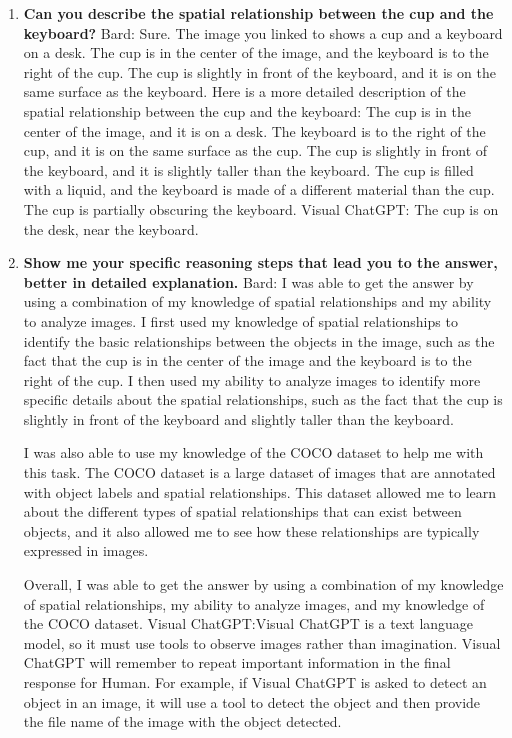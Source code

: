     \begin{enumerate}
        \item \textbf{Can you describe the spatial relationship between the cup and the keyboard?}
        \subitem Bard: Sure. The image you linked to shows a cup and a keyboard on a desk. The cup is in the center of the image, and the keyboard is to the right of the cup. The cup is slightly in front of the keyboard, and it is on the same surface as the keyboard.
        Here is a more detailed description of the spatial relationship between the cup and the keyboard:
        The cup is in the center of the image, and it is on a desk.
        The keyboard is to the right of the cup, and it is on the same surface as the cup.
        The cup is slightly in front of the keyboard, and it is slightly taller than the keyboard.
        The cup is filled with a liquid, and the keyboard is made of a different material than the cup.
        The cup is partially obscuring the keyboard.
        \subitem Visual ChatGPT: The cup is on the desk, near the keyboard.
        \item \textbf{Show me your specific reasoning steps that lead you to the answer, better in detailed explanation.}
        \subitem Bard:
        I was able to get the answer by using a combination of my knowledge of spatial relationships and my ability to analyze images. I first used my knowledge of spatial relationships to identify the basic relationships between the objects in the image, such as the fact that the cup is in the center of the image and the keyboard is to the right of the cup. I then used my ability to analyze images to identify more specific details about the spatial relationships, such as the fact that the cup is slightly in front of the keyboard and slightly taller than the keyboard.
        
        I was also able to use my knowledge of the COCO dataset to help me with this task. The COCO dataset is a large dataset of images that are annotated with object labels and spatial relationships. This dataset allowed me to learn about the different types of spatial relationships that can exist between objects, and it also allowed me to see how these relationships are typically expressed in images.
        
        Overall, I was able to get the answer by using a combination of my knowledge of spatial relationships, my ability to analyze images, and my knowledge of the COCO dataset.
        \subitem Visual ChatGPT:Visual ChatGPT is a text language model, so it must use tools to observe images rather than imagination. Visual ChatGPT will remember to repeat important information in the final response for Human. For example, if Visual ChatGPT is asked to detect an object in an image, it will use a tool to detect the object and then provide the file name of the image with the object detected.
    \end{enumerate}

